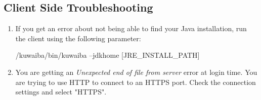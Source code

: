 \documentclass[a4paper]{article}
\begin{document}
				\subsection{Client Side Troubleshooting}
				\begin{enumerate}
					\item If you get an error about not being able to find your Java installation, run the client using the following parameter:
					\begin{verbbox}
						/kuwaiba/bin/kuwaiba --jdkhome [JRE_INSTALL_PATH]
					\end{verbbox}
					\begin{figure}[ht]
						\centering	
						\theverbbox
					\end{figure}
					\item You are getting an \textit{Unexpected end of file from server} error at login time. You are trying to use HTTP to connect to an HTTPS port. Check the connection settings and select "HTTPS".
				\end{enumerate}
		\newpage
\end{document}
